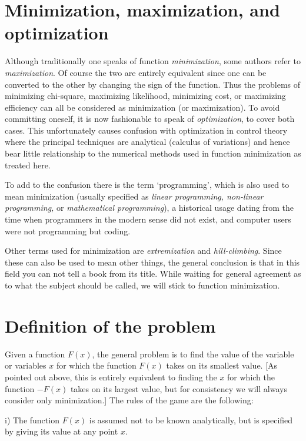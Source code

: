 \section{Minimization, maximization, and optimization}
 
Although traditionally one speaks of function {\em minimization}, some
authors refer to {\em maximization}.  Of course the two are entirely equivalent
since one can be converted to the other by changing the sign of the function.
Thus the problems of minimizing chi-square, maximizing likelihood,
minimizing cost, or maximizing efficiency can all be considered as
minimization (or maximization).  To avoid committing oneself, it is now 
fashionable to speak of {\em optimization}, to cover both cases.  This
unfortunately causes confusion with optimization in control theory where
the principal techniques are analytical (calculus of variations) and
hence bear little relationship to the numerical methods used in function
minimization as treated here.
 
To add to the confusion there is the term `programming', which is
also used to mean minimization (usually specified as {\em linear programming,
non-linear programming,} or {\em mathematical programming}), a historical usage
dating from the time when programmers in the modern sense did not exist,
and computer users were not programming but coding.
 
Other terms used for minimization are {\em extremization} and
{\em hill-climbing}.  Since these can also be used to mean other things, the
general conclusion is that in this field you can not tell a book from
its title.  While waiting for general agreement as to what the subject
should be called, we will stick to function minimization.
 
\section{Definition of the problem}
 
      Given a function $F(x)$, the general problem is to find the value of
the variable or variables $x$ for which the function $F(x)$ takes on its
smallest value.  [As pointed out above, this is entirely equivalent to
finding the $x$ for which the function $-F(x)$ takes on its largest value,
but for consistency we will always consider only minimization.]  The
rules of the game are the following:
 
  i) The function $F(x)$ is assumed not to be known analytically, but is
     specified by giving its value at any point $x$.
 
